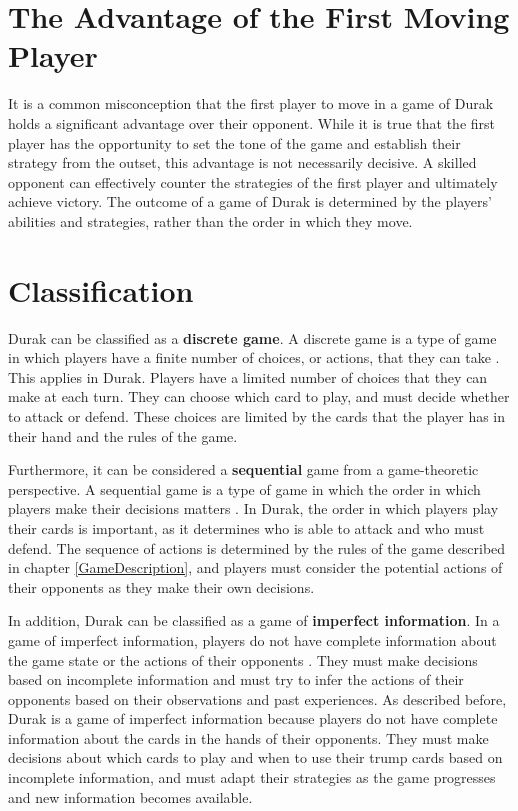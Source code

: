 \section{The Advantage of the First Moving Player}
It is a common misconception that the first player to move in a game of Durak holds a significant advantage over their opponent. While it is true that the first player has the opportunity to set the tone of the game and establish their strategy from the outset, this advantage is not necessarily decisive. A skilled opponent can effectively counter the strategies of the first player and ultimately achieve victory. The outcome of a game of Durak is determined by the players' abilities and strategies, rather than the order in which they move.

\section{Classification}

Durak can be classified as a \textbf{discrete game}. A discrete game is a type of game in which players have a finite number of choices, or actions, that they can take \citep{Gametheory4}. This applies in Durak. Players have a limited number of choices that they can make at each turn. They can choose which card to play, and must decide whether to attack or defend. These choices are limited by the cards that the player has in their hand and the rules of the game. 

Furthermore, it can be considered a \textbf{sequential} game from a game-theoretic perspective. A sequential game is a type of game in which the order in which players make their decisions matters \citep{Gametheory4}. In Durak, the order in which players play their cards is important, as it determines who is able to attack and who must defend. The sequence of actions is determined by the rules of the game described in chapter \ref{GameDescription}, and players must consider the potential actions of their opponents as they make their own decisions. 

In addition, Durak can be classified as a game of \textbf{imperfect information}. In a game of imperfect information, players do not have complete information about the game state or the actions of their opponents \citep{Gametheory4}. They must make decisions based on incomplete information and must try to infer the actions of their opponents based on their observations and past experiences. As described before, Durak is a game of imperfect information because players do not have complete information about the cards in the hands of their opponents. They must make decisions about which cards to play and when to use their trump cards based on incomplete information, and must adapt their strategies as the game progresses and new information becomes available.

